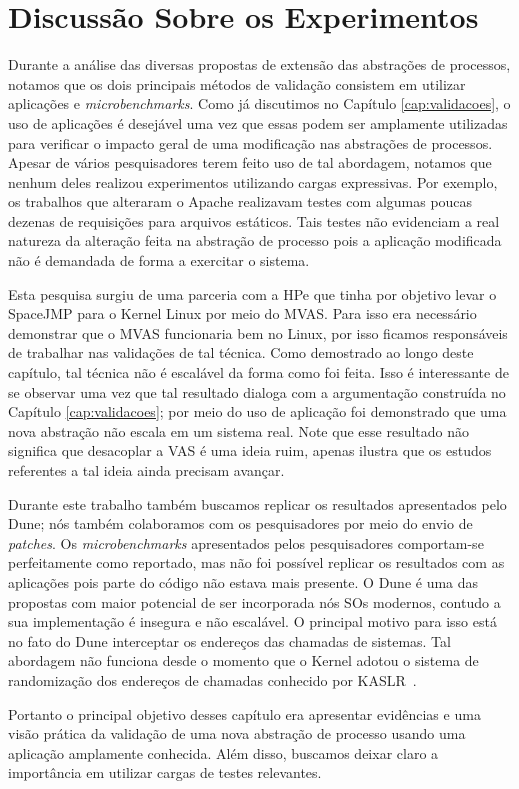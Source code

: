 
\section{Discussão Sobre os Experimentos}

Durante a análise das diversas propostas de extensão das abstrações de
processos, notamos que os dois principais métodos de validação consistem em
utilizar aplicações e \textit{microbenchmarks}. Como já discutimos no Capítulo
\ref{cap:validacoes}, o uso de aplicações é desejável uma vez que essas podem
ser amplamente utilizadas para verificar o impacto geral de uma modificação nas
abstrações de processos. Apesar de vários pesquisadores terem feito uso de tal
abordagem, notamos que nenhum deles realizou experimentos utilizando cargas
expressivas. Por exemplo, os trabalhos que alteraram o Apache realizavam testes
com algumas poucas dezenas de requisições para arquivos estáticos. Tais testes
não evidenciam a real natureza da alteração feita na abstração de processo pois
a aplicação modificada não é demandada de forma a exercitar o sistema.

Esta pesquisa surgiu de uma parceria com a HPe que tinha por objetivo levar o
SpaceJMP para o Kernel Linux por meio do MVAS. Para isso era necessário
demonstrar que o MVAS funcionaria bem no Linux, por isso ficamos responsáveis
de trabalhar nas validações de tal técnica. Como demostrado ao longo deste
capítulo, tal técnica não é escalável da forma como foi feita. Isso é
interessante de se observar uma vez que tal resultado dialoga com a
argumentação construída no Capítulo \ref{cap:validacoes}; por meio do uso de
aplicação foi demonstrado que uma nova abstração não escala em um sistema real.
Note que esse resultado não significa que desacoplar a VAS é uma ideia ruim,
apenas ilustra que os estudos referentes a tal ideia ainda precisam avançar.

Durante este trabalho também buscamos replicar os resultados apresentados pelo
Dune; nós também colaboramos com os pesquisadores por meio do envio de
\textit{patches}. Os \textit{microbenchmarks} apresentados pelos pesquisadores
comportam-se perfeitamente como reportado, mas não foi possível replicar os
resultados com as aplicações pois parte do código não estava mais presente. O
Dune é uma das propostas com maior potencial de ser incorporada nós SOs
modernos, contudo a sua implementação é insegura e não escalável. O principal
motivo para isso está no fato do Dune interceptar os endereços das chamadas de
sistemas. Tal abordagem não funciona desde o momento que o Kernel adotou o
sistema de randomização dos endereços de chamadas conhecido por
KASLR~\citep{kaslr}.

Portanto o principal objetivo desses capítulo era apresentar evidências e uma
visão prática da validação de uma nova abstração de processo usando uma
aplicação amplamente conhecida. Além disso, buscamos deixar claro a importância
em utilizar cargas de testes relevantes.
